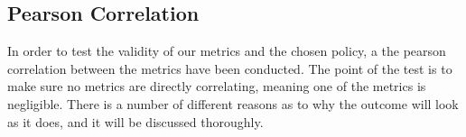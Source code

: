 \subsection{Pearson Correlation}\label{subsec:pearsoncorrelation}

In order to test the validity of our metrics and the chosen policy, a the pearson correlation between the metrics have been conducted. The point of the test is to make sure no metrics are directly correlating, meaning one of the metrics is negligible. There is a number of different reasons as to why the outcome will look as it does, and it will be discussed thoroughly.